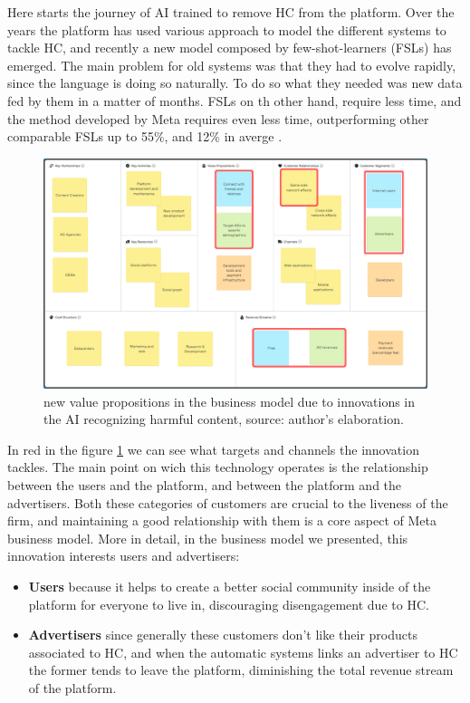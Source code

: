 Here starts the journey of AI trained to remove HC from the
platform. Over the years the platform has used various approach to
model the different systems to tackle HC, and recently a new model
composed by few-shot-learners (FSLs) has emerged. The main problem for
old systems was that they had to evolve rapidly, since the language is
doing so naturally. To do so what they needed was new data fed by them
in a matter of months. FSLs on th other hand, require less time, and
the method developed by Meta requires even less time, outperforming
other comparable FSLs up to 55\%, and 12\% in averge
\cite[pp.~5-8]{art:entailing}.

\begin{figure}[ht]
  \centering \includegraphics[width=.8\textwidth]{images/newcanvas}
  \caption{new value propositions in the business model due to
    innovations in the AI recognizing harmful content, source:
    author's elaboration.}
  \label{fig:newcanvas}
\end{figure}

In red in the figure \ref{fig:newcanvas} we can see what targets and
channels the innovation tackles. The main point on wich this
technology operates is the relationship between the users and the
platform, and between the platform and the advertisers. Both these
categories of customers are crucial to the liveness of the firm, and
maintaining a good relationship with them is a core aspect of Meta
business model. More in detail, in the business model we presented,
this innovation interests users and advertisers:

\begin{itemize}
\item \textbf{Users} because it helps to create a better social
  community inside of the platform for everyone to live in,
  discouraging disengagement due to HC.
\item \textbf{Advertisers} since generally these customers don't like
  their products associated to HC, and when the automatic systems
  links an advertiser to HC the former tends to leave the platform,
  diminishing the total revenue stream of the platform.
\end{itemize}
